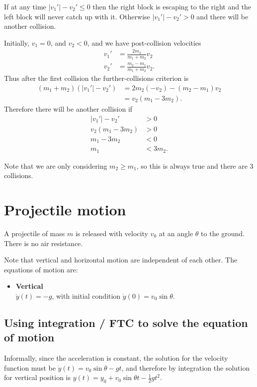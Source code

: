 \newpage
If at any time $|v_1'| - v_2' \leq 0$ then the right block is escaping to the right and the left
block will never catch up with it. Otherwise $|v_1'| - v_2' > 0$ and there will be another
collision.

Initially, $v_1 = 0$, and $v_2 < 0$, and we have post-collision velocities
\begin{align*}
  v_1' &= \frac{2m_2}{m_1 + m_2}v_2 \\
  v_2' &= \frac{m_2 - m_1}{m_1 + m_2}v_2.
\end{align*}
Thus after the first collision the further-collisions criterion is
\begin{align*}
  (m_1 + m_2)(|v_1'| - v_2')
  &= 2m_2(-v_2) - (m_2 - m_1)v_2 \\
  &= v_2(m_1 - 3m_2).
\end{align*}
Therefore there will be another collision if
\begin{align*}
  |v_1'| - v_2'   &> 0 \\
  v_2(m_1 - 3m_2) &> 0 \\
  m_1 - 3m_2      &< 0 \\
  m_1             &< 3m_2.
\end{align*}

Note that we are only considering $m_2 \geq m_1$, so this is always true and there are 3 collisions.
\section{Projectile motion}

A projectile of mass $m$ is released with velocity $v_0$ at an angle $\theta$ to the ground. There
is no air resistance.

Note that vertical and horizontal motion are independent of each other. The equations of motion are:

\begin{itemize}
\item {\bf Vertical}\\
  $\ddot{y}(t) = -g$, with initial condition $\dot{y}(0) = v_0\sin\theta$.
\end{itemize}

\subsection{Using integration / FTC to solve the equation of motion}
Informally, since the acceleration is constant, the solution for the velocity function must be
$\dot{y}(t) = v_0\sin\theta - gt$, and therefore by integration the solution for vertical
position is $y(t) = y_0 + v_0\sin\theta t -\frac{1}{2}gt^2$.

